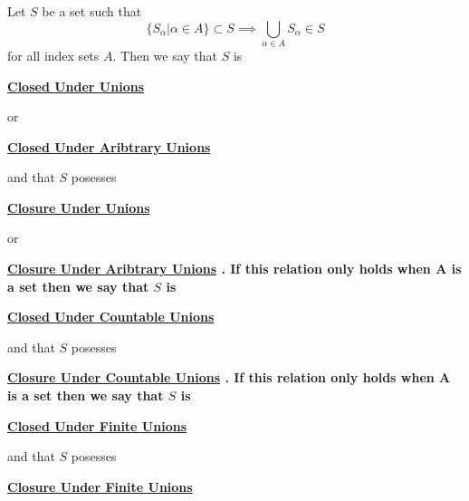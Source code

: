 \newcommand{\ClosureUnderFiniteUnions}[0]{
    \bf \hyperref[def:ClosureUnderUnion]{Closure Under Finite Unions} \rm
}
\newcommand{\ClosureUnderCountableUnions}[0]{
    \bf \hyperref[def:ClosureUnderUnion]{Closure Under Countable Unions} \rm
}
\newcommand{\ClosureUnderUnions}[0]{
    \bf \hyperref[def:ClosureUnderUnion]{Closure Under Unions} \rm
}
\newcommand{\ClosureUnderArbitraryUnions}[0]{
    \bf \hyperref[def:ClosureUnderUnion]{Closure Under Aribtrary Unions} \rm
}
\newcommand{\ClosedUnderFiniteUnions}[0]{
    \bf \hyperref[def:ClosureUnderUnion]{Closed Under Finite Unions} \rm
}
\newcommand{\ClosedUnderCountableUnions}[0]{
    \bf \hyperref[def:ClosureUnderUnion]{Closed Under Countable Unions} \rm
}
\newcommand{\ClosedUnderUnions}[0]{
    \bf \hyperref[def:ClosureUnderUnion]{Closed Under Unions} \rm
}
\newcommand{\ClosedUnderArbitraryUnions}[0]{
    \bf \hyperref[def:ClosureUnderUnion]{Closed Under Aribtrary Unions} \rm
}\begin{df}
\label{def:ClosureUnderUnion}

\rm
    Let $S$ be a set such that 
    \begin{equation*}
    \{ S_\alpha | \alpha \in A\} \subset S \implies \bigcup_{\alpha \in A} S_{\alpha}   \in S
    \end{equation*}
    for all index sets $A$. 
    Then we say that $S$ is 
    \ClosedUnderUnions
    or
    \ClosedUnderArbitraryUnions
    and that $S$ posesses 
    \ClosureUnderUnions
    or
    \ClosureUnderArbitraryUnions.
    If this relation only holds when A is a 
    \Countable set then we say that 
    $S$ is 
    \ClosedUnderCountableUnions
    and that $S$ posesses
    \ClosureUnderCountableUnions. 
    If this relation only holds when A is a 
    \Finite set then we say that 
    $S$ is 
    \ClosedUnderFiniteUnions
    and that $S$ posesses
    \ClosureUnderFiniteUnions    
\end{df}
